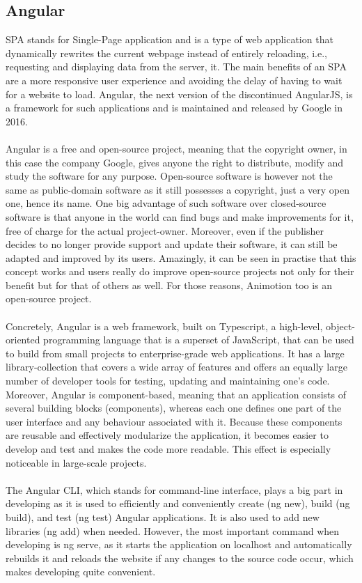 \subsection{Angular}
SPA stands for Single-Page application and is a type of web application that dynamically rewrites the 
current webpage instead of entirely reloading, i.e., requesting and displaying data from the server, it. 
The main benefits of an SPA are a more responsive user experience and avoiding the delay of having to wait 
for a website to load. Angular, the next version of the discontinued AngularJS, is a framework for such 
applications and is maintained and released by Google in 2016.
\\
\\
Angular is a free and open-source project, meaning that the copyright owner, in this case the company Google,
gives anyone the right to distribute, modify and study the software for any purpose. Open-source software is 
however not the same as public-domain software as it still possesses a copyright, just a very open one, hence its name. 
One big advantage of such software over closed-source software is that anyone in the world can find bugs and make 
improvements for it, free of charge for the actual project-owner. Moreover, even if the publisher decides to no longer 
provide support and update their software, it can still be adapted and improved by its users. Amazingly, it can be seen 
in practise that this concept works and users really do improve open-source projects not only for their benefit but for 
that of others as well. For those reasons, Animotion too is an open-source project.\cite{Opensource}
\\
\\
Concretely, Angular is a web framework, built on Typescript, a high-level, object-oriented programming language that is 
a superset of JavaScript, that can be used to build from small projects to enterprise-grade web applications. It has a 
large library-collection that covers a wide array of features and offers an equally large number of developer tools for 
testing, updating and maintaining one's code. Moreover, Angular is component-based, meaning that an application consists 
of several building blocks (components), whereas each one defines one part of the user interface and any behaviour associated 
with it. Because these components are reusable and effectively modularize the application, it becomes easier to develop and 
test and makes the code more readable. This effect is especially noticeable in large-scale projects. \cite{AngularDescription}
\\
\\
The Angular CLI, which stands for command-line interface, plays a big part in developing as it is used to efficiently and 
conveniently create (ng new), build (ng build), and test (ng test) Angular applications. It is also used to add new libraries 
(ng add) when needed. However, the most important command when developing is ng serve, as it starts the application on 
localhost and automatically rebuilds it and reloads the website if any changes to the source code occur, which makes 
developing quite convenient. \cite{AngularCLI}
\\
\\
